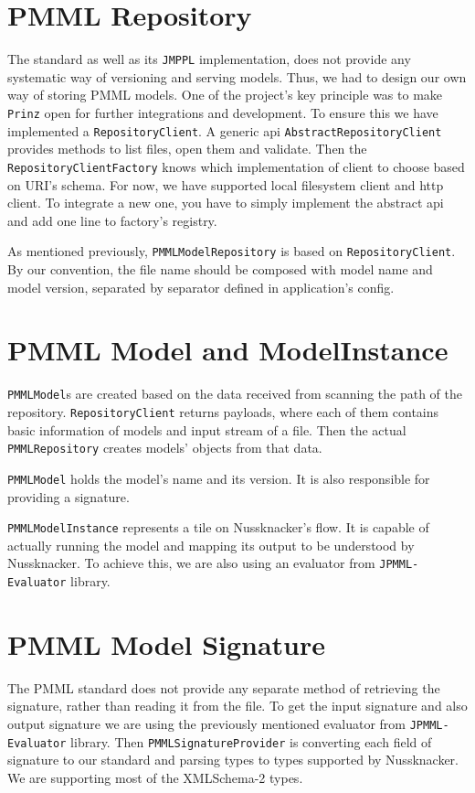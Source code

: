 \section{PMML Repository}

The standard as well as its \texttt{JMPPL} implementation, does not provide any systematic way of versioning and serving models.
Thus, we had to design our own way of storing PMML models. One of the project’s key principle was
to make \texttt{Prinz} open for further integrations and development. To ensure this we have implemented a \texttt{RepositoryClient}.
A generic api \texttt{AbstractRepositoryClient} provides methods to list files, open them and validate. Then the \texttt{RepositoryClientFactory}
knows which implementation of client to choose based on URI’s schema. For now, we have supported local filesystem client and http client.
To integrate a new one, you have to simply implement the abstract api and add one line to factory’s registry.

As mentioned previously, \texttt{PMMLModelRepository} is based on \texttt{RepositoryClient}. By our convention,
the file name should be composed with model name and model version, separated by separator defined in application’s config.

\section{PMML Model and ModelInstance}

\texttt{PMMLModel}s are created based on the data received from scanning the path of the repository.
\texttt{RepositoryClient} returns payloads, where each of them contains basic information of models and input stream of a file.
Then the actual \texttt{PMMLRepository} creates models’ objects from that data.

\texttt{PMMLModel} holds the model’s name and its version. It is also responsible for providing a signature.

\texttt{PMMLModelInstance} represents a tile on Nussknacker’s flow. It is capable of actually running the model and mapping its output to be understood by Nussknacker.
To achieve this, we are also using an evaluator from \texttt{JPMML-Evaluator} library.

\section{PMML Model Signature}

The PMML standard does not provide any separate method of retrieving the signature, rather than reading it from the file.
To get the input signature and also output signature we are using the previously mentioned evaluator from \texttt{JPMML-Evaluator} library.
Then \texttt{PMMLSignatureProvider} is converting each field of signature to our standard and parsing types to types supported by Nussknacker.
We are supporting most of the XMLSchema-2 types.
